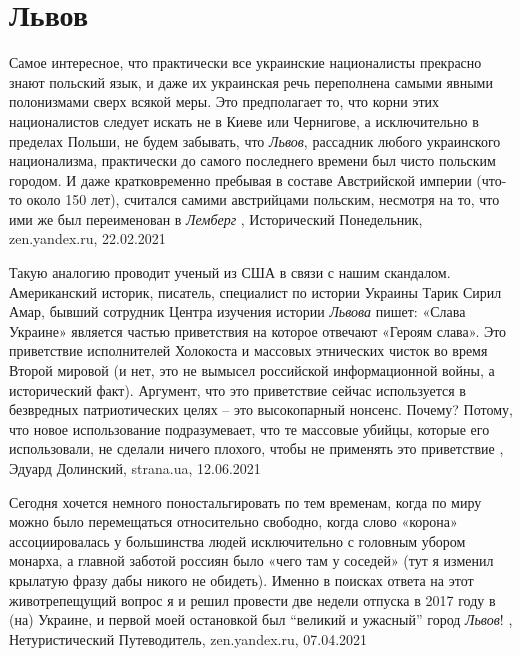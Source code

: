  
 
 
 
 
\chapter{Львов}
\label{sec:slova.lvov}

Самое интересное, что практически все украинские националисты прекрасно знают
польский язык, и даже их украинская речь переполнена самыми явными полонизмами
сверх всякой меры. Это предполагает то, что корни этих националистов следует
искать не в Киеве или Чернигове, а исключительно в пределах Польши, не будем
забывать, что \emph{Львов}, рассадник любого украинского национализма, практически до
самого последнего времени был чисто польским городом. И даже кратковременно
пребывая в составе Австрийской империи (что-то около 150 лет), считался самими
австрийцами польским, несмотря на то, что ими же был переименован в \emph{Лемберг}
, 
Исторический Понедельник, zen.yandex.ru, 22.02.2021 

Такую аналогию проводит ученый из США в связи с нашим скандалом.  Американский
историк, писатель, специалист по истории Украины Тарик Сирил Амар, бывший
сотрудник Центра изучения истории \emph{Львова} пишет: «Слава Украине» является
частью приветствия на которое отвечают «Героям слава». Это приветствие
исполнителей Холокоста и массовых этнических чисток во время Второй мировой (и
нет, это не вымысел российской информационной войны, а исторический факт).
Аргумент, что это приветствие сейчас используется в безвредных патриотических
целях – это высокопарный нонсенс. Почему? Потому, что новое использование
подразумевает, что те массовые убийцы, которые его использовали, не сделали
ничего плохого, чтобы не применять это приветствие
, 
Эдуард Долинский, strana.ua, 12.06.2021

Сегодня хочется немного поностальгировать по тем временам, когда по миру можно
было перемещаться относительно свободно, когда слово «корона» ассоциировалась у
большинства людей исключительно с головным убором монарха, а главной заботой
россиян было «чего там у соседей» (тут я изменил крылатую фразу дабы никого не
обидеть). Именно в поисках ответа на этот животрепещущий вопрос я и решил
провести две недели отпуска в 2017 году в (на) Украине, и первой моей
остановкой был \enquote{великий и ужасный} город \emph{Львов}!
, 
Нетуристический Путеводитель, zen.yandex.ru, 07.04.2021

